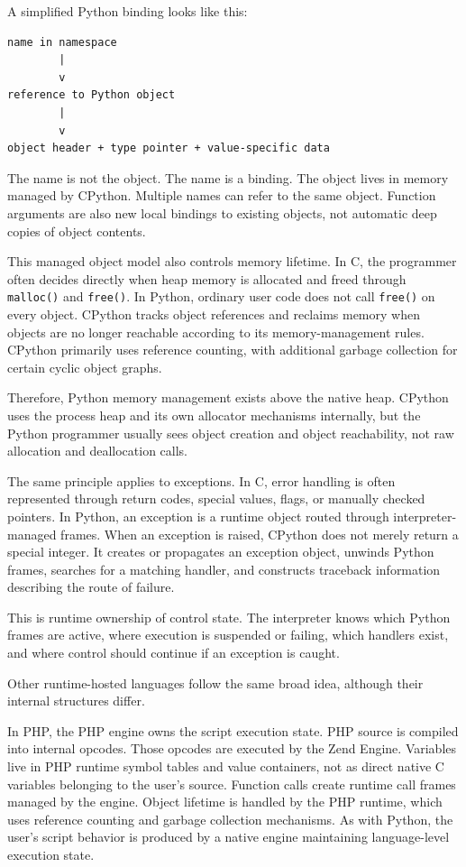 A simplified Python binding looks like this:

\begin{verbatim}
name in namespace
        |
        v
reference to Python object
        |
        v
object header + type pointer + value-specific data
\end{verbatim}

The name is not the object. The name is a binding. The object lives in memory managed by CPython. Multiple names can refer to the same object. Function arguments are also new local bindings to existing objects, not automatic deep copies of object contents.

This managed object model also controls memory lifetime. In C, the programmer often decides directly when heap memory is allocated and freed through \texttt{malloc()} and \texttt{free()}. In Python, ordinary user code does not call \texttt{free()} on every object. CPython tracks object references and reclaims memory when objects are no longer reachable according to its memory-management rules. CPython primarily uses reference counting, with additional garbage collection for certain cyclic object graphs.

Therefore, Python memory management exists above the native heap. CPython uses the process heap and its own allocator mechanisms internally, but the Python programmer usually sees object creation and object reachability, not raw allocation and deallocation calls.

The same principle applies to exceptions. In C, error handling is often represented through return codes, special values, flags, or manually checked pointers. In Python, an exception is a runtime object routed through interpreter-managed frames. When an exception is raised, CPython does not merely return a special integer. It creates or propagates an exception object, unwinds Python frames, searches for a matching handler, and constructs traceback information describing the route of failure.

This is runtime ownership of control state. The interpreter knows which Python frames are active, where execution is suspended or failing, which handlers exist, and where control should continue if an exception is caught.

Other runtime-hosted languages follow the same broad idea, although their internal structures differ.

In PHP, the PHP engine owns the script execution state. PHP source is compiled into internal opcodes. Those opcodes are executed by the Zend Engine. Variables live in PHP runtime symbol tables and value containers, not as direct native C variables belonging to the user's source. Function calls create runtime call frames managed by the engine. Object lifetime is handled by the PHP runtime, which uses reference counting and garbage collection mechanisms. As with Python, the user's script behavior is produced by a native engine maintaining language-level execution state.

